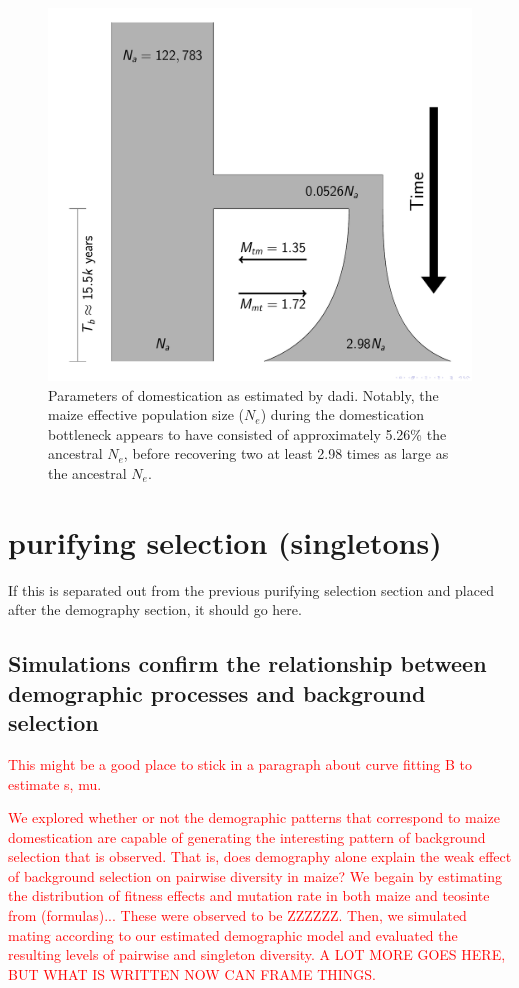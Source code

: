 \documentclass{pnastwo}
\begin{document}
\begin{article}
\begin{figure}[b]
\centering
\includegraphics[width=.4\textwidth]{FigsAndFiles/DomesticationModel/domesticationModel.pdf}
\caption{Parameters of domestication as estimated by dadi. Notably,
  the maize effective population size ($N_e$) during the domestication
  bottleneck appears to have consisted of approximately 5.26\%
  the ancestral $N_e$, before recovering two at least 2.98
  times as large as the ancestral $N_e$. \label{fig:bottleneck} }
\end{figure}

\section{purifying selection (singletons)}
If this is separated out from the previous purifying selection section
and placed after the demography section, it should go here.




\subsection{Simulations confirm the relationship between demographic
  processes and background selection}
\textcolor{red}{This might be a good place to stick in a paragraph
  about curve fitting B to estimate s, mu.}


\textcolor{red}{We explored whether or not the demographic patterns
  that correspond to maize domestication are capable of generating the
  interesting pattern of background selection that is observed. That
  is, does demography alone explain the weak effect of background
  selection on pairwise diversity in maize? We begain by estimating
  the distribution of fitness effects and mutation rate in both maize and teosinte from
  (formulas)... These were observed to be ZZZZZZ. Then, we simulated
  mating according to our estimated demographic model and evaluated
  the resulting levels of pairwise and singleton diversity. A LOT MORE
GOES HERE, BUT WHAT IS WRITTEN NOW CAN FRAME THINGS.}



\end{article}
\end{document}
